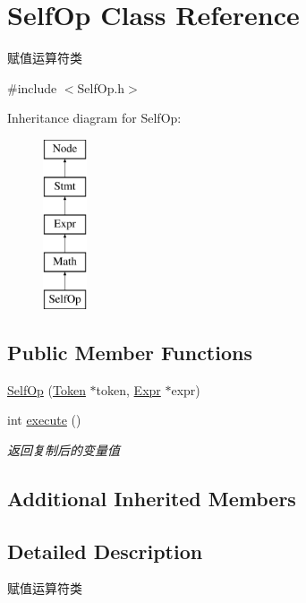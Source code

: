 \hypertarget{class_self_op}{}\section{Self\+Op Class Reference}
\label{class_self_op}


赋值运算符类  




{\ttfamily \#include $<$Self\+Op.\+h$>$}

Inheritance diagram for Self\+Op\+:\begin{figure}[H]
\begin{center}
\leavevmode
\includegraphics[height=5.000000cm]{class_self_op}
\end{center}
\end{figure}
\subsection*{Public Member Functions}
\begin{DoxyCompactItemize}
\item 
\hyperlink{class_self_op_a5292e81fca1817185db15b29564a32ee}{Self\+Op} (\hyperlink{class_token}{Token} $\ast$token, \hyperlink{class_expr}{Expr} $\ast$expr)
\item 
\mbox{\label{class_self_op_ab452bcad1cd4f1286813b1f737583818}} 
int \hyperlink{class_self_op_ab452bcad1cd4f1286813b1f737583818}{execute} ()
\begin{DoxyCompactList}\small\item\em 返回复制后的变量值 \end{DoxyCompactList}\end{DoxyCompactItemize}
\subsection*{Additional Inherited Members}


\subsection{Detailed Description}
赋值运算符类 

